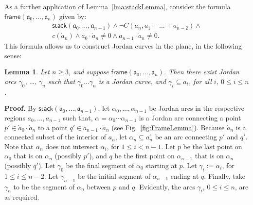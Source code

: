 \documentclass{article}
\newtheorem{lemma}[theorem]{Lemma}
\newcommand{\ti}[2][]{{#2}^{\circ_{#1}}}
\newcommand{\tseq}[1]{\mathfrak{#1}}
\newcommand{\intermediate}[1]{\dot{#1}}
\newcommand{\inner}[1]{\ddot{#1}}
\newcommand{\stack}{\mathsf{stack}}
\newcommand{\frameFla}{\mathsf{frame}}
\newcommand{\qedsymbol}{\ding{113}}
\newenvironment{proof}{\par\noindent\textbf{Proof.}}{\mbox{}\hfill\qedsymbol\par\bigskip}
\begin{document}
As a further application of Lemma~\ref{lma:stackLemma}, consider the
formula $\frameFla(\tseq{a}_0, \ldots, \tseq{a}_n)$ given by:
\begin{align}
  \stack(\tseq{a}_0, \ldots, \tseq{a}_{n-1}) \wedge \lnot C(a_n,a_1+\ldots+a_{n-2})\wedge\nonumber\\
     c(\intermediate a_n)\wedge \intermediate{a}_0\cdot \intermediate a_n\neq 0\wedge 
	\inner{a}_{n-1}\cdot \intermediate a_n\neq 0.
\label{eq:frame}
\end{align}
This formula allows us to construct Jordan curves in the plane, in
the following sense:
\begin{lemma}
\label{lma:FrameLemma}
Let $n\geq 3$, and suppose $\frameFla(\tseq{a}_0, \ldots,
\tseq{a}_n)$.  Then there exist Jordan arcs $\gamma_0$, \ldots,
$\gamma_n$ such that $\gamma_0\ldots\gamma_n$ is a Jordan
curve, and $\gamma_i \subseteq a_i$, for all $i$, $0 \leq i \leq n$.
\end{lemma}
\begin{proof}
By $\stack(\tseq a_0,\ldots,\tseq a_{n-1})$, let
$\alpha_0,\ldots,\alpha_{n-1}$ be Jordan arcs in the respective
regions $a_0,\ldots,a_{n-1}$ such that, 
$\alpha=\alpha_0\cdots\alpha_{n-1}$ is a Jordan arc connecting 
a point $p'\in \intermediate{a}_0\cdot \intermediate a_n$ to a 
point $q'\in \inner{a}_{n-1}\cdot \intermediate a_n$ (see 
Fig.~\ref{fig:FrameLemma}). Because $\intermediate a_n$ is a 
connected subset of the interior of $a_n$, let $\alpha_n\subseteq \ti a_n$ 
be an arc connecting $p'$ and $q'$. Note that $\alpha_n$ does not intersect 
$\alpha_i$, for $1\leq i< n-1$. Let $p$ be the last point on $\alpha_0$ that 
is on $\alpha_n$ (possibly $p'$), and $q$ be the first point on $\alpha_{n-1}$ 
that is on $\alpha_n$ (possibly $q'$). Let $\gamma_0$ be the final segment of 
$\alpha_0$ starting at $p$. Let $\gamma_i:=\alpha_i$, for $1\leq i\leq n-2$.
Let $\gamma_{n-1}$ be the initial segment of $\alpha_{n-1}$ ending at $q$.
Finally, take $\gamma_n$ to be the segment of $\alpha_n$ between $p$ and $q$.
Evidently, the arcs $\gamma_i$, $0\leq i\leq n$, are as required.
\end{proof}
\end{document}
